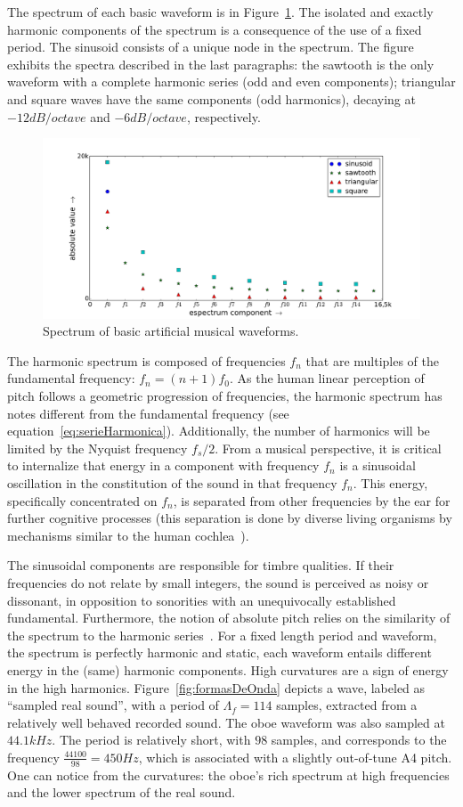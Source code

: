 The spectrum of each basic waveform is in Figure~\ref{fig:espectroDeOndas}. The isolated and exactly harmonic components of the spectrum is a consequence of the use of a fixed period. The sinusoid consists of a unique node in the spectrum. The figure exhibits the spectra described in the last paragraphs: the sawtooth is the only waveform with a complete harmonic series (odd and even components); triangular and square waves have the same components (odd harmonics), decaying at $-12dB/octave$ and $-6dB/octave$, respectively.

\begin{figure}
    \centering
        \includegraphics[width=.7\textwidth]{figures/waveSpectrum}
    \caption{Spectrum of basic artificial musical waveforms.}
        \label{fig:espectroDeOndas}
\end{figure}

The harmonic spectrum is composed of frequencies $f_n$ that are multiples of the fundamental frequency: $f_n=(n+1)f_0$. As the human linear perception of pitch follows a geometric progression of frequencies, the harmonic spectrum has notes different from the fundamental frequency (see equation~\ref{eq:serieHarmonica}). Additionally, the number of harmonics will be limited by the Nyquist frequency $f_s/2$. From a musical perspective, it is critical to internalize that energy in a component with frequency $f_n$ is a sinusoidal oscillation in the constitution of the sound in that frequency $f_n$. This energy, specifically concentrated on $f_n$, is separated from other frequencies by the ear for further cognitive processes (this separation is done by diverse living organisms by mechanisms similar to the human cochlea~\cite{Roederer}).

The sinusoidal components are responsible for timbre qualities. If their frequencies do not relate by small integers, the sound is perceived as noisy or dissonant, in opposition to sonorities with an unequivocally established fundamental. Furthermore, the notion of absolute pitch relies on the similarity of the spectrum to the harmonic series~\cite{Roederer}. For a fixed length period and waveform, the spectrum is perfectly harmonic and static, each waveform entails different energy in the (same) harmonic components. High curvatures are a sign of energy in the high harmonics. Figure~\ref{fig:formasDeOnda} depicts a wave, labeled as ``sampled real sound'', with a period of $\Lambda_f=114$ samples, extracted from a relatively well behaved recorded sound. The oboe waveform was also sampled at $44.1kHz$. The period is relatively short, with $98$ samples, and corresponds to the frequency $\frac{44100}{98}=450Hz$, which is associated with a slightly out-of-tune A4 pitch. One can notice from the curvatures: the oboe's rich spectrum at high frequencies and the lower spectrum of the real sound.

